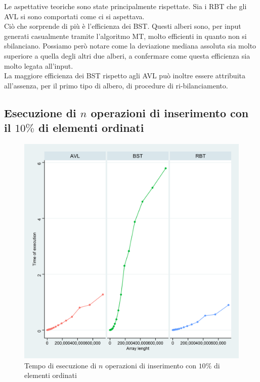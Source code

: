 \documentclass{article}
\begin{document}
	Le aspettative teoriche sono state principalmente rispettate. Sia i RBT che gli AVL si sono comportati come ci si aspettava.\\
	Ciò che sorprende di più è l'efficienza dei BST. Questi alberi sono, per input generati casualmente tramite l'algoritmo MT, molto efficienti in quanto non si sbilanciano. Possiamo però notare come la deviazione mediana assoluta sia molto superiore a quella degli altri due alberi, a confermare come questa efficienza sia molto legata all'input. \\
	La maggiore efficienza dei BST rispetto agli AVL può inoltre essere attribuita all'assenza, per il primo tipo di albero, di procedure di ri-bilanciamento.
	
	\newpage
	
	\subsection{Esecuzione di $n$ operazioni di inserimento con il $10\%$ di elementi ordinati}
	\label{subsection:n_op_ins_ord}
		
	\begin{figure}[h!]
		\centering
  		\includegraphics[width=1 \columnwidth]{Grafici/Grafico_All_ordered.png}
  		\caption{Tempo di esecuzione di $n$ operazioni di inserimento con $10\%$ di elementi ordinati}
  		\label{fig:graph2}
	\end{figure}
	
\end{document}
